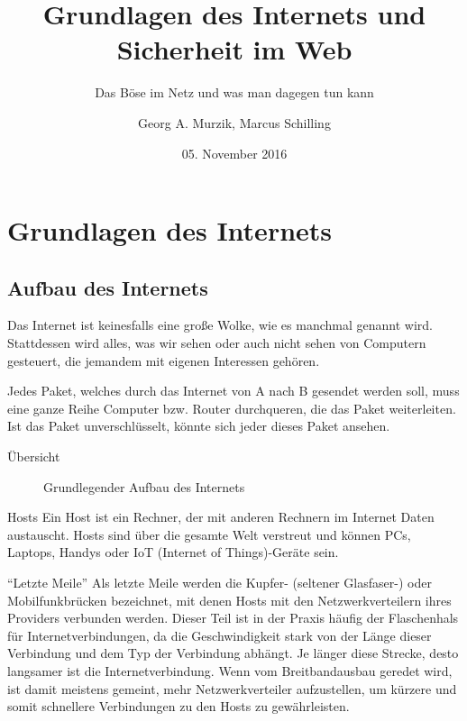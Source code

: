 \documentclass[utf8]{beamer}
\title{Grundlagen des Internets und Sicherheit im Web}
\subtitle{Das Böse im Netz und was man dagegen tun kann} %
\author{Georg A. Murzik, Marcus Schilling}
\institute{Terminal.21}
\date{05. November 2016}
\begin{document}
	
	\begin{frame}
		\titlepage
	\end{frame}
	
	\section{Grundlagen des Internets}
	\subsection{Aufbau des Internets}
	\begin{frame}
		Das Internet ist keinesfalls eine große Wolke, wie es manchmal genannt wird. Stattdessen wird alles, was wir sehen oder auch nicht sehen von Computern gesteuert, die jemandem mit eigenen Interessen gehören.
		
		Jedes Paket, welches durch das Internet von A nach B gesendet werden soll, muss eine ganze Reihe Computer bzw. Router durchqueren, die das Paket weiterleiten. Ist das Paket unverschlüsselt, könnte sich jeder dieses Paket ansehen.
	\end{frame}
	
	\begin{frame}{Übersicht}
		\begin{figure}[H]
			\label{fig:Übersicht des Internets}
			\caption{Grundlegender Aufbau des Internets}
		\end{figure}
	\end{frame}
	
	\begin{frame}{Hosts}
		Ein Host ist ein Rechner, der mit anderen Rechnern im Internet Daten austauscht. Hosts sind über die gesamte Welt verstreut und können PCs, Laptops, Handys oder IoT (Internet of Things)-Geräte sein.
	\end{frame}
	
	\begin{frame}{\enquote{Letzte Meile}}
		Als letzte Meile werden die Kupfer- (seltener Glasfaser-) oder Mobilfunkbrücken bezeichnet, mit denen Hosts mit den Netzwerkverteilern ihres Providers verbunden werden. Dieser Teil ist in der Praxis häufig der Flaschenhals für Internetverbindungen, da die Geschwindigkeit stark von der Länge dieser Verbindung und dem Typ der Verbindung abhängt. Je länger diese Strecke, desto langsamer ist die Internetverbindung.
		Wenn vom Breitbandausbau geredet wird, ist damit meistens gemeint, mehr Netzwerkverteiler aufzustellen, um kürzere und somit schnellere Verbindungen zu den Hosts zu gewährleisten.		
	\end{frame}
\end{document}
